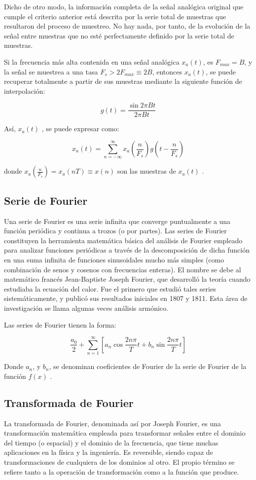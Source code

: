 \documentclass[comsoc, journal]{IEEEtran}
\begin{document}
Dicho de otro modo, la información completa de la señal analógica original que cumple el criterio anterior está descrita por la serie total de muestras que resultaron del proceso de muestreo. No hay nada, por tanto, de la evolución de la señal entre muestras que no esté perfectamente definido por la serie total de muestras.

Si la frecuencia más alta contenida en una señal analógica $x_a(t)$, es $F_{max}=B$, y la señal se muestrea a una tasa $F_s>2F_{max} \equiv 2B$, entonces $x_a(t)$, se puede recuperar totalmente a partir de sus muestras mediante la siguiente función de interpolación:

$$g(t) = \frac{\sin 2 \pi B t}{2 \pi B t}$$

Así, $x_a(t)$ , se puede expresar como:

$$x_a(t) = \sum_{n=-\infty}^{\infty} x_a \left(\frac{n}{F_s}\right) g \left(t-\frac{n}{F_s}\right)$$

donde $x_a \left(\frac{n}{F_s}\right)= x_a \left(nT\right) \equiv x \left(n\right)$ son las muestras de $x_a \left(t\right)$ \cite{nyquist}.

\subsection{Serie de Fourier}
Una serie de Fourier es una serie infinita que converge puntualmente a una función periódica y continua a trozos (o por partes). Las series de Fourier constituyen la herramienta matemática básica del análisis de Fourier empleado para analizar funciones periódicas a través de la descomposición de dicha función en una suma infinita de funciones sinusoidales mucho más simples (como combinación de senos y cosenos con frecuencias enteras). El nombre se debe al matemático francés Jean-Baptiste Joseph Fourier, que desarrolló la teoría cuando estudiaba la ecuación del calor. Fue el primero que estudió tales series sistemáticamente, y publicó sus resultados iniciales en 1807 y 1811. Esta área de investigación se llama algunas veces análisis armónico.

Las series de Fourier tienen la forma:

$$\frac{a_0}{2} + \sum_{n=1}^\infty\left[a_n\cos\frac{2n\pi}{T}t + b_n\sin\frac{2n\pi}{T}t\right]$$

Donde $a_n$, y $b_n$, se denominan coeficientes de Fourier de la serie de Fourier de la función $f(x)$ \cite{spiegel}.

\subsection{Transformada de Fourier}
La transformada de Fourier, denominada así por Joseph Fourier, es una transformación matemática empleada para transformar señales entre el dominio del tiempo (o espacial) y el dominio de la frecuencia, que tiene muchas aplicaciones en la física y la ingeniería. Es reversible, siendo capaz de transformaciones de cualquiera de los dominios al otro. El propio término se refiere tanto a la operación de transformación como a la función que produce.
\end{document}
